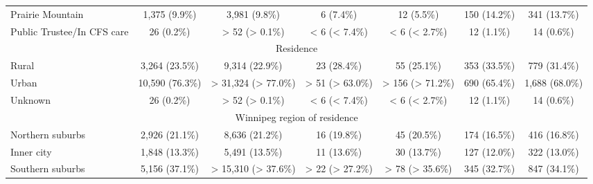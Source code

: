 \documentclass{article}
\begin{document}
\begin{table}[htbp]
\begin{longtable}{l*{6}{c}}
  Prairie Mountain                                      &          1,375 (9.9\%)          &          3,981 (9.8\%)          &            6 (7.4\%)            &            12 (5.5\%)           &           150 (14.2\%)          &           341 (13.7\%)          \\
  Public Trustee/In CFS care                            &            26 (0.2\%)           &          > 52 (> 0.1\%)         &          < 6 (< 7.4\%)          &          < 6 (< 2.7\%)          &            12 (1.1\%)           &            14 (0.6\%)           \\
\multicolumn{7}{c}{Residence                                               }\\
  Rural                                                 &          3,264 (23.5\%)         &          9,314 (22.9\%)         &           23 (28.4\%)           &           55 (25.1\%)           &           353 (33.5\%)          &           779 (31.4\%)          \\
  Urban                                                 &         10,590 (76.3\%)         &       > 31,324 (> 77.0\%)       &         > 51 (> 63.0\%)         &         > 156 (> 71.2\%)        &           690 (65.4\%)          &          1,688 (68.0\%)         \\
  Unknown                                               &            26 (0.2\%)           &          > 52 (> 0.1\%)         &          < 6 (< 7.4\%)          &          < 6 (< 2.7\%)          &            12 (1.1\%)           &            14 (0.6\%)           \\
\multicolumn{7}{c}{Winnipeg region of residence                            }\\
  Northern suburbs                                      &          2,926 (21.1\%)         &          8,636 (21.2\%)         &           16 (19.8\%)           &           45 (20.5\%)           &           174 (16.5\%)          &           416 (16.8\%)          \\
  Inner city                                            &          1,848 (13.3\%)         &          5,491 (13.5\%)         &           11 (13.6\%)           &           30 (13.7\%)           &           127 (12.0\%)          &           322 (13.0\%)          \\
  Southern suburbs                                      &          5,156 (37.1\%)         &       > 15,310 (> 37.6\%)       &         > 22 (> 27.2\%)         &         > 78 (> 35.6\%)         &           345 (32.7\%)          &           847 (34.1\%)          \\

\end{longtable}
\end{table}
\end{document}
